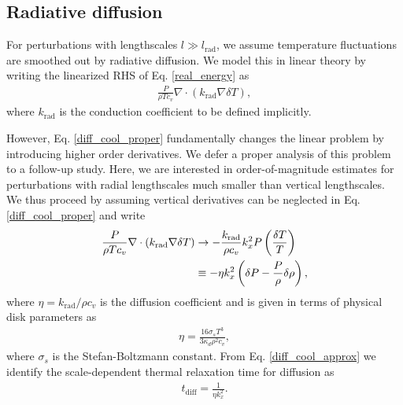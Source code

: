 \subsection{Radiative diffusion}
For perturbations with lengthscales $l\gg
l_\mathrm{rad}$, we assume  
temperature fluctuations are smoothed out by radiative diffusion. We
model this in linear theory by writing the linearized RHS of
Eq. \ref{real_energy} as 
\begin{align}\label{diff_cool_proper}
  \frac{P}{\rho T c_v} \nabla\cdot\left(k_\mathrm{rad}\nabla\delta
    T\right),  
\end{align}
where $k_\mathrm{rad}$ is the conduction coefficient to be defined
implicitly. 

However, Eq. \ref{diff_cool_proper} fundamentally changes the linear problem by
introducing higher order derivatives. We defer a proper analysis of
this problem to a follow-up study. Here, we are interested in
order-of-magnitude estimates for perturbations with radial
lengthscales much smaller than vertical lengthscales. We thus proceed
by assuming vertical derivatives can be neglected in
Eq. \ref{diff_cool_proper} and write  
\begin{align}\label{diff_cool_approx}
  \frac{P}{\rho T c_v} \nabla\cdot\left(k_\mathrm{rad}\nabla\delta
    T\right) &\to -\frac{k_\mathrm{rad}}{\rho
    c_v}k_x^2P\left(\frac{\delta T}{T}\right)\notag\\
  &\equiv -\eta k_x^2 \left(\delta P - \frac{P}{\rho}\delta\rho\right), 
\end{align}
where $\eta=k_\mathrm{rad}/\rho c_v$ is the diffusion coefficient and
is given in terms of physical disk parameters as 
\begin{align}\label{eta_def}
  \eta = \frac{16\sigma_s T^3}{3\kappa_d\rho^2 c_v}, 
\end{align}
where $\sigma_s$ is the Stefan-Boltzmann constant. 
From Eq. \ref{diff_cool_approx} we identify the scale-dependent thermal relaxation
time for diffusion as 
\begin{align}\label{tc_diff_cool} 
  t_\mathrm{diff} = \frac{1}{\eta k_x^2}.%
\end{align}


